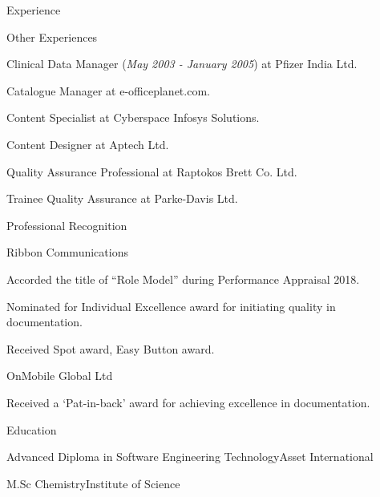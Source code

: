 \documentclass{resume} %
\begin{document}
\begin{rSection}{Experience}
\begin{rSubsection}{Other Experiences}{}{}{}
\item Clinical Data Manager (\emph {May 2003 - January 2005}) at Pfizer India Ltd.
\item Catalogue Manager at e-officeplanet.com. 
\item Content Specialist at Cyberspace Infosys Solutions.
\item Content Designer at Aptech Ltd.
\item Quality Assurance Professional at Raptokos Brett Co. Ltd.
\item Trainee Quality Assurance at Parke-Davis Ltd.
\end{rSubsection}

\end{rSection}



\begin{rSection}{Professional Recognition}

\begin{rSubsection}{Ribbon Communications}{}{}{}
\item Accorded the title of “Role Model” during Performance Appraisal 2018.
\item Nominated for Individual Excellence award for initiating quality in documentation.
\item Received Spot award, Easy Button award.
\end{rSubsection}


\begin{rSubsection}{OnMobile Global Ltd}{}{}{}
\item Received a ‘Pat-in-back’ award for achieving excellence in documentation.
\end{rSubsection}

\end{rSection}



\begin{rSection}{Education}

\begin{rSubsection}{Advanced Diploma
in Software Engineering Technology}{}{Asset International}{}
\end{rSubsection}


\begin{rSubsection}{M.Sc Chemistry}{}{Institute of Science}{}
\end{rSubsection}

\end{rSection}
\end{document}
